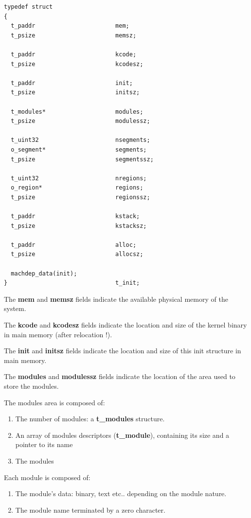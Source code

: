 \begin{verbatim}
typedef struct
{
  t_paddr                       mem;
  t_psize                       memsz;

  t_paddr                       kcode;
  t_psize                       kcodesz;

  t_paddr                       init;
  t_psize                       initsz;

  t_modules*                    modules;
  t_psize                       modulessz;

  t_uint32                      nsegments;
  o_segment*                    segments;
  t_psize                       segmentssz;

  t_uint32                      nregions;
  o_region*                     regions;
  t_psize                       regionssz;

  t_paddr                       kstack;
  t_psize                       kstacksz;

  t_paddr                       alloc;
  t_psize                       allocsz;

  machdep_data(init);
}                               t_init;
\end{verbatim}

The \textbf{mem} and \textbf{memsz} fields indicate the available physical
memory of the system.

The \textbf{kcode} and \textbf{kcodesz} fields indicate the location and
size of the kernel binary in main memory (after relocation !).

The \textbf{init} and \textbf{initsz} fields indicate the location and
size of this init structure in main memory.

The \textbf{modules} and \textbf{modulessz} fields indicate the
location of the area used to store the modules.

The modules area is composed of:

\begin{enumerate}
  \item
    The number of modules: a \textbf{t\_modules} structure.
  \item
    An array  of modules descriptors  (\textbf{t\_module}), containing
    its size and a pointer to its name
  \item
    The modules
\end{enumerate}

Each module is composed of:

\begin{enumerate}
  \item
    The module's data: binary, text etc.. depending on the module nature.
  \item
    The module name terminated by a zero character.
\end{enumerate}

